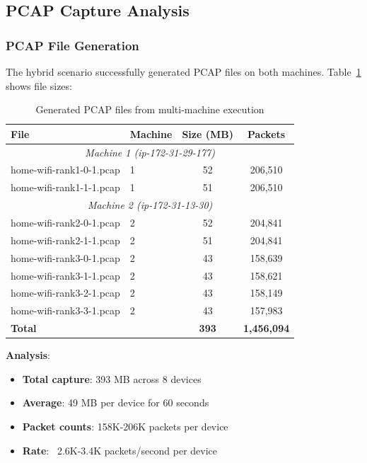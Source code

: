\subsection{PCAP Capture Analysis}

\subsubsection{PCAP File Generation}

The hybrid scenario successfully generated PCAP files on both machines. Table~\ref{tab:pcap-files} shows file sizes:

\begin{table}[htbp]
\centering
\caption{Generated PCAP files from multi-machine execution}
\label{tab:pcap-files}
\small
\begin{tabular}{@{}llcc@{}}
\toprule
\textbf{File} & \textbf{Machine} & \textbf{Size (MB)} & \textbf{Packets} \\
\midrule
\multicolumn{4}{c}{\textit{Machine 1 (ip-172-31-29-177)}} \\
home-wifi-rank1-0-1.pcap & 1 & 52 & 206,510 \\
home-wifi-rank1-1-1.pcap & 1 & 51 & 206,510 \\
\midrule
\multicolumn{4}{c}{\textit{Machine 2 (ip-172-31-13-30)}} \\
home-wifi-rank2-0-1.pcap & 2 & 52 & 204,841 \\
home-wifi-rank2-1-1.pcap & 2 & 51 & 204,841 \\
home-wifi-rank3-0-1.pcap & 2 & 43 & 158,639 \\
home-wifi-rank3-1-1.pcap & 2 & 43 & 158,621 \\
home-wifi-rank3-2-1.pcap & 2 & 43 & 158,149 \\
home-wifi-rank3-3-1.pcap & 2 & 43 & 157,983 \\
\midrule
\textbf{Total} & & \textbf{393} & \textbf{1,456,094} \\
\bottomrule
\end{tabular}
\end{table}

\textbf{Analysis}:
\begin{itemize}
    \item \textbf{Total capture}: 393 MB across 8 devices
    \item \textbf{Average}: 49 MB per device for 60 seconds
    \item \textbf{Packet counts}: 158K-206K packets per device
    \item \textbf{Rate}: ~2.6K-3.4K packets/second per device
\end{itemize}


